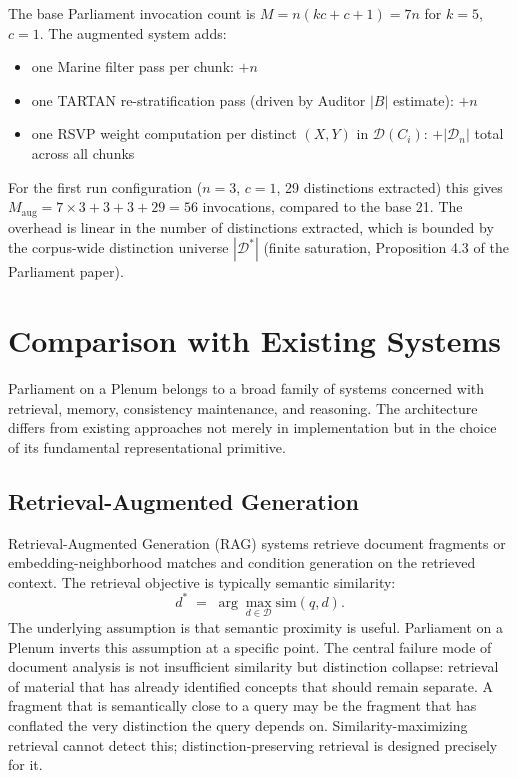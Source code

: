 \documentclass[12pt, a4paper]{article}
\theoremstyle{plain}
\theoremstyle{definition}
\theoremstyle{remark}
\begin{document}
The base Parliament invocation count is $M = n(kc + c + 1) = 7n$ for $k=5$, $c=1$. The augmented system adds:
\begin{itemize}
\item one Marine filter pass per chunk: $+n$
\item one TARTAN re-stratification pass (driven by Auditor $|B|$ estimate): $+n$
\item one RSVP weight computation per distinct $(X,Y)$ in $\mathcal{D}(C_i)$: $+|\mathcal{D}_n|$ total across all chunks
\end{itemize}
For the first run configuration ($n=3$, $c=1$, 29 distinctions extracted) this gives $M_\mathrm{aug} = 7 \times 3 + 3 + 3 + 29 = 56$ invocations, compared to the base 21. The overhead is linear in the number of distinctions extracted, which is bounded by the corpus-wide distinction universe $|\mathcal{D}^*|$ (finite saturation, Proposition 4.3 of the Parliament paper).

\section{Comparison with Existing Systems}
\label{sec:comparison}

Parliament on a Plenum belongs to a broad family of systems concerned with retrieval, memory, consistency maintenance, and reasoning. The architecture differs from existing approaches not merely in implementation but in the choice of its fundamental representational primitive.

\subsection{Retrieval-Augmented Generation}

Retrieval-Augmented Generation (RAG) systems retrieve document fragments or embedding-neighborhood matches and condition generation on the retrieved context. The retrieval objective is typically semantic similarity:
\[
d^* \;=\; \arg\max_{d \in \mathcal{D}} \mathrm{sim}(q, d).
\]
The underlying assumption is that semantic proximity is useful. Parliament on a Plenum inverts this assumption at a specific point. The central failure mode of document analysis is not insufficient similarity but distinction collapse: retrieval of material that has already identified concepts that should remain separate. A fragment that is semantically close to a query may be the fragment that has conflated the very distinction the query depends on. Similarity-maximizing retrieval cannot detect this; distinction-preserving retrieval is designed precisely for it.
\end{document}
